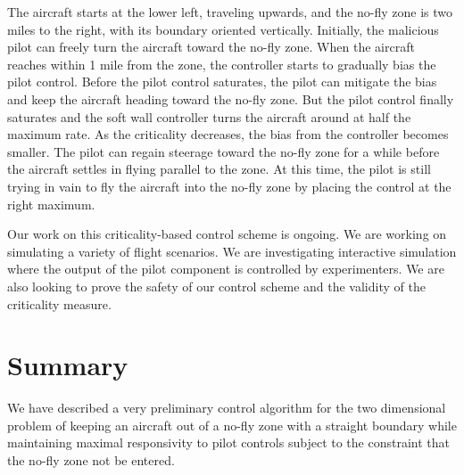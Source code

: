 \documentclass[11pt]{article}
\begin{document}
The aircraft starts at the lower left, traveling upwards, and the no-fly zone
is two miles to the right, with its boundary oriented vertically.
Initially, the malicious pilot can freely turn the aircraft toward the no-fly
zone. When the aircraft reaches within 1 mile from the zone, the controller
starts to gradually bias the pilot control. Before the pilot control saturates,
the pilot can mitigate the bias and keep the aircraft heading toward the no-fly
zone. But the pilot control finally saturates and the soft wall controller 
turns the aircraft around at half the maximum rate. As the criticality
decreases, the bias from the controller becomes smaller. The pilot can regain
steerage toward the no-fly zone for a while before the aircraft settles in
flying parallel to the zone. At this time, the pilot is still trying in vain
to fly the aircraft into the no-fly zone by placing the control at the right
maximum.

Our work on this criticality-based control scheme is ongoing. We are working on
simulating a variety of flight scenarios. We are investigating interactive
simulation where the output of the pilot component is controlled by 
experimenters. We are also looking to prove the safety of our control scheme
and the validity of the criticality measure.

\section{Summary}

We have described a
very preliminary control algorithm for the two dimensional problem
of keeping an aircraft out of a no-fly zone with a straight boundary
while maintaining maximal responsivity to pilot controls subject
to the constraint that the no-fly zone not be entered.
\end{document}
